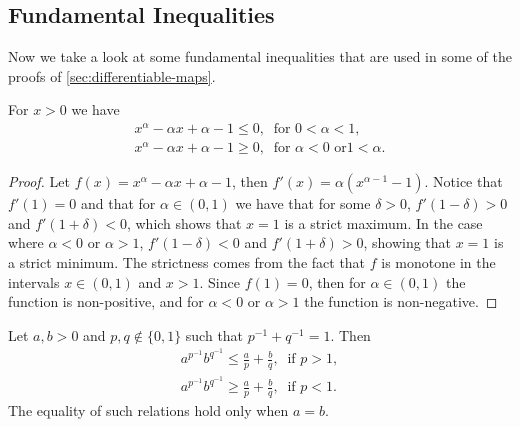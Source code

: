 \subsection{Fundamental Inequalities}

Now we take a look at some fundamental inequalities that are used in some of the
proofs of \cref{sec:differentiable-maps}.

\begin{lemma}\label{lem: CI}
For \(x > 0\) we have
\begin{gather}
\label{eq: CI-1}
x^\alpha - \alpha x + \alpha - 1 \leq 0,\ \text{ for } 0 < \alpha < 1, \\
\label{eq: CI-2}
x^\alpha - \alpha x + \alpha - 1 \geq 0,\ \text{ for } \alpha < 0 \text{ or
} 1 < \alpha.
\end{gather}
\end{lemma}

\begin{proof}
Let \(f(x) = x^\alpha - \alpha x + \alpha - 1\), then \(f'(x) =
\alpha(x^{\alpha - 1} - 1)\). Notice that \(f'(1) = 0\) and that for \(\alpha
\in (0, 1)\) we have that for some \(\delta > 0\), \(f'(1 - \delta) > 0\) and
\(f'(1 + \delta) < 0\), which shows that \(x = 1\) is a strict maximum. In the
case where \(\alpha < 0\) or \(\alpha > 1\), \(f'(1 - \delta) < 0\) and \(f'(1
+ \delta) > 0\), showing that \(x = 1\) is a strict minimum. The strictness
comes from the fact that \(f\) is monotone in the intervals \(x \in (0, 1)\)
and \(x > 1\). Since \(f(1) = 0\), then for \(\alpha \in (0, 1)\) the function
is non-positive, and for \(\alpha < 0\) or \(\alpha > 1\) the function is
non-negative.
\end{proof}

\begin{proposition}\label{prop: young-ineq}
Let \(a, b >0\) and \(p, q \not\in \{0, 1\}\) such that \(p^{-1} + q^{-1} =
1\). Then
\begin{gather}
\label{eq: young-1}
a^{p^{-1}} b^{q^{-1}} \leq \frac a p  + \frac b q,\ \text{ if } p > 1,
\\
\label{eq: young-2}
a^{p^{-1}} b^{q^{-1}} \geq \frac a p  + \frac b q,\ \text{ if } p < 1.
\end{gather}
The equality of such relations hold only when \(a = b\).
\end{proposition}

